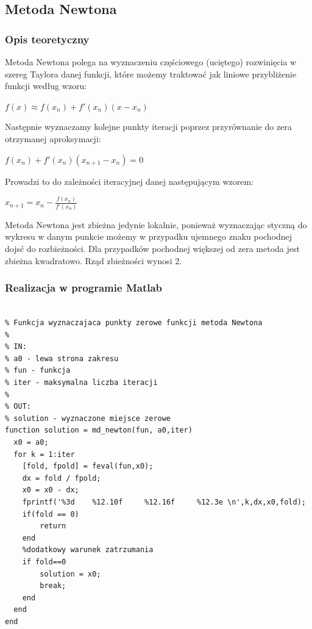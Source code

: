\documentclass[11pt, oneside]{article}   	%
\begin{document}
\subsection{Metoda Newtona}
\subsubsection{Opis teoretyczny}
Metoda Newtona polega na wyznaczeniu częściowego (uciętego) rozwinięcia w szereg Taylora danej funkcji, które możemy traktować jak liniowe przybliżenie funkcji według wzoru:\
  	\begin{center}
  	$f(x) \approx f(x_{n})+f'(x_{n})(x-x_{n})$
	\end{center}
Następnie wyznaczamy kolejne punkty iteracji poprzez przyrównanie do zera otrzymanej aproksymacji:\\
\begin{center}
$f(x_{n})+f'(x_{n})(x_{n+1}-x_{n}) = 0$
\end{center}
Prowadzi to do zależności iteracyjnej danej następującym wzorem:\\
\begin{center}
$x_{n+1} = x_{n}-\frac{f(x_{n})}{f'(x_{n})}$
\end{center}
Metoda Newtona jest zbieżna jedynie lokalnie, ponieważ wyznaczając styczną do wykresu w danym punkcie możemy w przypadku ujemnego znaku pochodnej dojsć do rozbieżności. Dla przypadków pochodnej większej od zera metoda jest zbieżna kwadratowo. Rząd zbieżności wynosi 2.

\subsubsection{Realizacja w programie Matlab}
\begin{lstlisting}[caption=Implementacja metody Newtona]

% Funkcja wyznaczajaca punkty zerowe funkcji metoda Newtona
%
% IN:
% a0 - lewa strona zakresu
% fun - funkcja 
% iter - maksymalna liczba iteracji
%
% OUT:
% solution - wyznaczone miejsce zerowe
function solution = md_newton(fun, a0,iter)
  x0 = a0; 
  for k = 1:iter
    [fold, fpold] = feval(fun,x0); 
    dx = fold / fpold; 
    x0 = x0 - dx;
    fprintf('%3d	%12.10f     %12.16f     %12.3e \n',k,dx,x0,fold);
    if(fold == 0)
        return
    end
    %dodatkowy warunek zatrzumania
	if fold==0 
        solution = x0;
        break; 
    end
  end
end

\end{lstlisting}
\end{document}

